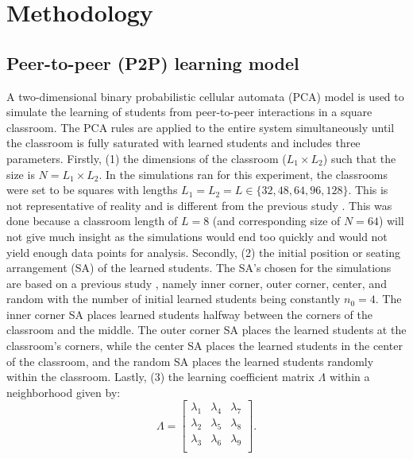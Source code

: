 \documentclass[10pt,a4paper,twoside]{article}
\begin{document}
\section{Methodology}\label{sec:methods}
\subsection{Peer-to-peer (P2P) learning model}
A two-dimensional binary probabilistic cellular automata (PCA) model is used to simulate the learning of students from peer-to-peer interactions in a square classroom. The PCA rules are applied to the entire system simultaneously until the classroom is fully saturated with learned students and includes three parameters. Firstly, (1) the dimensions of the classroom ($L_1 \times L_2$) such that the size is $N=L_1 \times L_2$. In the simulations ran for this experiment, the classrooms were set to be squares with lengths $L_1 = L_2 = L \in \lbrace 32,48,64,96,128\rbrace$. This is not representative of reality and is different from the previous study \cite{roxas2010seating}. This was done because a classroom length of $L=8$ (and corresponding size of $N=64$) will not give much insight as the simulations would end too quickly and would not yield enough data points for analysis. Secondly, (2) the initial position or seating arrangement (SA) of the learned students. The SA's chosen for the simulations are based on a previous study \cite{roxas2010seating}, namely inner corner, outer corner, center, and random with the number of initial learned students being constantly $n_0 = 4$. The inner corner SA places learned students halfway between the corners of the classroom and the middle. The outer corner SA places the learned students at the classroom's corners, while the center SA places the learned students in the center of the classroom, and the random SA places the learned students randomly within the classroom. Lastly, (3) the learning coefficient matrix $\Lambda$ within a neighborhood given by:
\begin{equation}\label{eq:Lambda matrix}
  \Lambda = 
  \begin{bmatrix}
  \lambda_1 & \lambda_4 & \lambda_7\\
  \lambda_2 & \lambda_5 & \lambda_8\\
  \lambda_3 & \lambda_6 & \lambda_9\\
  \end{bmatrix} \text{.}%
\end{equation}
\end{document}
